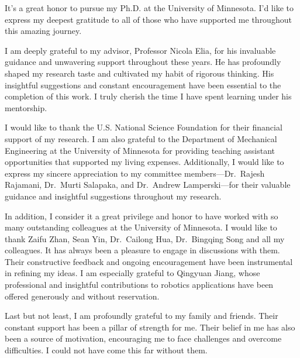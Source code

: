 It's a great honor to pursue my Ph.D. at the University of Minnesota. I'd like to express my deepest gratitude to all of those who have supported me throughout this amazing journey.

I am deeply grateful to my advisor, Professor Nicola Elia, for his invaluable guidance and unwavering support throughout these years. He has profoundly shaped my research taste and cultivated my habit of rigorous thinking. His insightful suggestions and constant encouragement have been essential to the completion of this work. I truly cherish the time I have spent learning under his mentorship.

I would like to thank the U.S. National Science Foundation for their financial support of my research. I am also grateful to the Department of Mechanical Engineering at the University of Minnesota for providing teaching assistant opportunities that supported my living expenses. Additionally, I would like to express my sincere appreciation to my committee members---Dr.~Rajesh Rajamani, Dr.~Murti Salapaka, and Dr.~Andrew Lamperski---for their valuable guidance and insightful suggestions throughout my research.

In addition, I consider it a great privilege and honor to have worked with so many outstanding colleagues at the University of Minnesota. I would like to thank Zaifu Zhan, Sean Yin, Dr.~Cailong Hua, Dr.~Bingqing Song and all my colleagues. It has always been a pleasure to engage in discussions with them. Their constructive feedback and ongoing encouragement have been instrumental in refining my ideas. I am especially grateful to Qingyuan Jiang, whose professional and insightful contributions to robotics applications have been offered generously and without reservation.

Last but not least, I am profoundly grateful to my family and friends. 
Their constant support has been a pillar of strength for me. 
Their belief in me has also been a source of motivation, encouraging me to face challenges and overcome difficulties. I could not have come this far without them.

